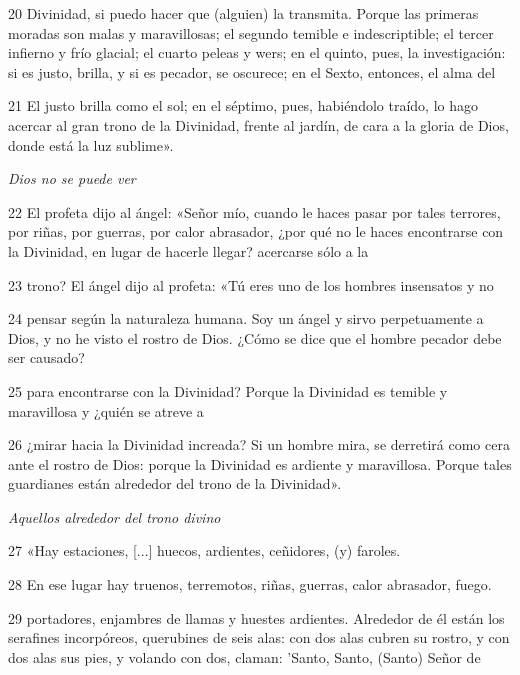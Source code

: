 \par 20 Divinidad, si puedo hacer que (alguien) la transmita. Porque las primeras moradas son malas y maravillosas; el segundo temible e indescriptible; el tercer infierno y frío glacial; el cuarto peleas y wers; en el quinto, pues, la investigación: si es justo, brilla, y si es pecador, se oscurece; en el Sexto, entonces, el alma del

\par 21 El justo brilla como el sol; en el séptimo, pues, habiéndolo traído, lo hago acercar al gran trono de la Divinidad, frente al jardín, de cara a la gloria de Dios, donde está la luz sublime».

\par \textit{Dios no se puede ver}

\par 22 El profeta dijo al ángel: «Señor mío, cuando le haces pasar por tales terrores, por riñas, por guerras, por calor abrasador, ¿por qué no le haces encontrarse con la Divinidad, en lugar de hacerle llegar? acercarse sólo a la

\par 23 trono? El ángel dijo al profeta: «Tú eres uno de los hombres insensatos y no

\par 24 pensar según la naturaleza humana. Soy un ángel y sirvo perpetuamente a Dios, y no he visto el rostro de Dios. ¿Cómo se dice que el hombre pecador debe ser causado?

\par 25 para encontrarse con la Divinidad? Porque la Divinidad es temible y maravillosa y ¿quién se atreve a

\par 26 ¿mirar hacia la Divinidad increada? Si un hombre mira, se derretirá como cera ante el rostro de Dios: porque la Divinidad es ardiente y maravillosa. Porque tales guardianes están alrededor del trono de la Divinidad».

\par \textit{Aquellos alrededor del trono divino}

\par 27 «Hay estaciones, [...] huecos, ardientes, ceñidores, (y) faroles.

\par 28 En ese lugar hay truenos, terremotos, riñas, guerras, calor abrasador, fuego.

\par 29 portadores, enjambres de llamas y huestes ardientes. Alrededor de él están los serafines incorpóreos, querubines de seis alas: con dos alas cubren su rostro, y con dos alas sus pies, y volando con dos, claman: 'Santo, Santo, (Santo) Señor de

